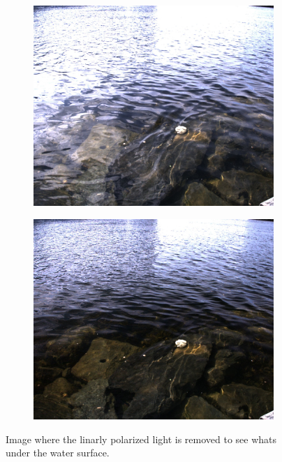 \begin{figure}[H]
    \begin{subfigure}[T]{.49\textwidth}
        \includegraphics[width=\textwidth]{figures/pictures/img_4722_s0.jpg}
    \end{subfigure} \hfill
    \begin{subfigure}[T]{.49\textwidth}
        \includegraphics[width=\textwidth]{figures/pictures/img_4722_unpol.jpg}
    \end{subfigure}
    \caption{Image where the linarly polarized light is removed to see whats under the water surface.}
\end{figure}
\vspace{-.5cm}

